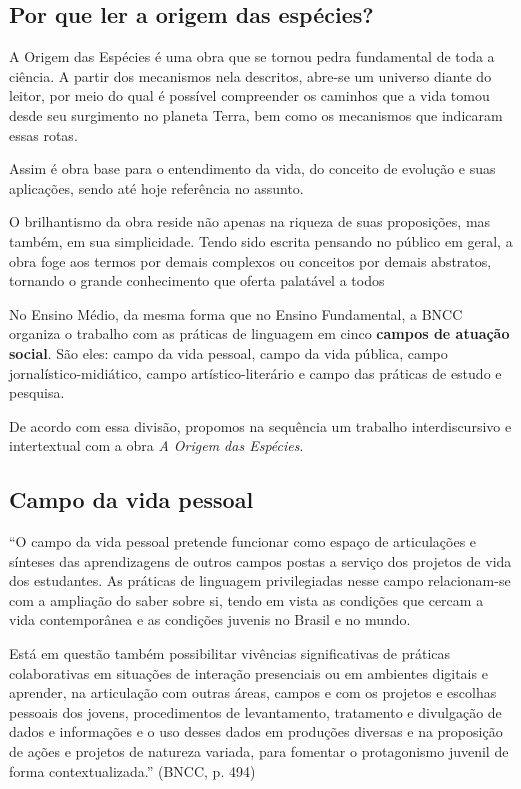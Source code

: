 \documentclass[12pt]{extarticle}
\begin{document}
\subsection{Por que ler a origem das espécies?}

A Origem das Espécies é uma obra que se tornou pedra fundamental de toda
a ciência. A partir dos mecanismos nela descritos, abre-se um universo diante
do leitor, por meio do qual é possível compreender os caminhos que a vida tomou
desde seu surgimento no planeta Terra, bem como os mecanismos que indicaram
essas rotas.

Assim é obra base para o entendimento da vida, do conceito de evolução e suas
aplicações, sendo até hoje referência no assunto.

O brilhantismo da obra reside não apenas na riqueza de suas proposições, mas
também, em sua simplicidade. Tendo sido escrita pensando no público em geral,
a obra foge aos termos por demais complexos ou conceitos por demais abstratos,
tornando o grande conhecimento que oferta palatável a todos


No Ensino Médio, da mesma forma que no Ensino Fundamental, a BNCC organiza
o trabalho com as práticas de linguagem em cinco \textbf{campos de atuação
social}. São eles: campo da vida pessoal, campo da vida pública, campo
jornalístico-midiático, campo artístico-literário e campo das práticas de
estudo e pesquisa.

De acordo com essa divisão, propomos na sequência um trabalho interdiscursivo
e intertextual com a obra \emph{A Origem das Espécies}.

\subsection{Campo da vida pessoal}

``O campo da vida pessoal pretende funcionar como espaço de articulações
e sínteses das aprendizagens de outros campos postas a serviço dos projetos de
vida dos estudantes. As práticas de linguagem privilegiadas nesse campo
relacionam-se com a ampliação do saber sobre si, tendo em vista as condições
que cercam a vida contemporânea e as condições juvenis no Brasil e no mundo.

Está em questão também possibilitar vivências significativas de práticas
colaborativas em situações de interação presenciais ou em ambientes digitais
e aprender, na articulação com outras áreas, campos e com os projetos
e escolhas pessoais dos jovens, procedimentos de levantamento, tratamento
e divulgação de dados e informações e o uso desses dados em produções diversas
e na proposição de ações e projetos de natureza variada, para fomentar
o protagonismo juvenil de forma contextualizada.'' (BNCC, p. 494)
\end{document}
